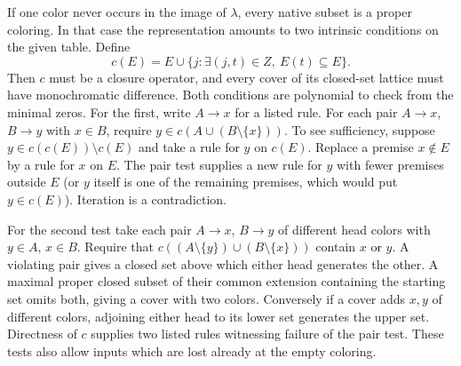 If one color never occurs in the image of $\lambda$, every native
subset is a proper coloring. In that case the representation amounts
to two intrinsic conditions on the given table. Define
\[
 c(E)=E\cup\{j:\exists (j,t)\in Z,\ E(t)\subseteq E\}.
\]
Then $c$ must be a closure operator, and every cover of its closed-set
lattice must have monochromatic difference. Both conditions are
polynomial to check from the minimal zeros. For the first, write
$A\to x$ for a listed rule. For each pair $A\to x$, $B\to y$ with
$x\in B$, require $y\in c(A\cup(B\setminus\{x\}))$.
To see sufficiency, suppose $y\in c(c(E))\setminus c(E)$ and take
a rule for $y$ on $c(E)$. Replace a premise $x\notin E$ by a rule
for $x$ on $E$. The pair test supplies a new rule for $y$ with fewer
premises outside $E$ (or $y$ itself is one of the remaining premises,
which would put $y\in c(E)$). Iteration is a contradiction.

For the second test take each pair $A\to x$, $B\to y$ of different
head colors with $y\in A$, $x\in B$. Require that $c((A\setminus
\{y\})\cup(B\setminus\{x\}))$ contain $x$ or $y$. A violating pair
gives a closed set above which either head generates the other.
A maximal proper closed subset of their common extension containing
the starting set omits both, giving a cover with two colors. Conversely
if a cover adds $x,y$ of different colors, adjoining either head to
its lower set generates the upper set. Directness of $c$ supplies
two listed rules witnessing failure of the pair test. These tests
also allow inputs which are lost already at the empty coloring.

